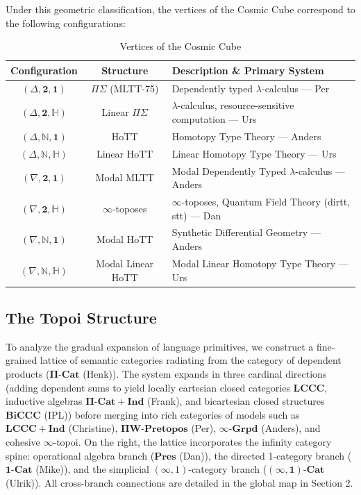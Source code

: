 \documentclass{article}
\theoremstyle{definition}
\theoremstyle{plain}
\begin{document}
Under this geometric classification, the vertices of the Cosmic Cube correspond to the following configurations:
\begin{table}[ht!]
\centering
\caption{Vertices of the Cosmic Cube}
\label{tab:cosmic_cube}
\begin{tabular}{ccl}
\hline
\textbf{Configuration} & \textbf{Structure} & \textbf{Description \& Primary System} \\
\hline
$(\Delta, \mathbf{2}, \mathbf{1})$ & $\Pi\Sigma$ (MLTT-75) & Dependently typed $\lambda$-calculus --- Per \\
$(\Delta, \mathbf{2}, \mathbb{H})$ & Linear $\Pi\Sigma$ & $\lambda$-calculus, resource-sensitive computation --- Urs \\
$(\Delta, \mathbb{N}, \mathbf{1})$ & HoTT & Homotopy Type Theory --- Anders \\
$(\Delta, \mathbb{N}, \mathbb{H})$ & Linear HoTT & Linear Homotopy Type Theory --- Urs \\
$(\nabla, \mathbf{2}, \mathbf{1})$ & Modal MLTT & Modal Dependently Typed $\lambda$-calculus --- Anders \\
$(\nabla, \mathbf{2}, \mathbb{H})$ & $\infty$-toposes & $\infty$-toposes, Quantum Field Theory (dirtt, stt) --- Dan \\
$(\nabla, \mathbb{N}, \mathbf{1})$ & Modal HoTT & Synthetic Differential Geometry --- Anders \\
$(\nabla, \mathbb{N}, \mathbb{H})$ & Modal Linear HoTT & Modal Linear Homotopy Type Theory --- Urs \\
\hline
\end{tabular}
\end{table}

\newpage
\subsection{The Topoi Structure}
To analyze the gradual expansion of language primitives, we construct a fine-grained lattice of semantic categories radiating from the category of dependent products ($\mathbf{\Pi}\text{-}\mathbf{Cat}$ (Henk)). The system expands in three cardinal directions (adding dependent sums to yield locally cartesian closed categories $\mathbf{LCCC}$, inductive algebras $\mathbf{\Pi}\text{-}\mathbf{Cat} + \mathbf{Ind}$ (Frank), and bicartesian closed structures $\mathbf{BiCCC}$ (IPL)) before merging into rich categories of models such as $\mathbf{LCCC} + \mathbf{Ind}$ (Christine), $\mathbf{\Pi W}\text{-}\mathbf{Pretopos}$ (Per), $\infty\text{-}\mathbf{Grpd}$ (Anders), and cohesive $\infty$-topoi. On the right, the lattice incorporates the infinity category spine: operational algebra branch ($\mathbf{Pres}$ (Dan)), the directed 1-category branch ($\mathbf{1\text{-}Cat}$ (Mike)), and the simplicial $(\infty, 1)$-category branch ($\mathbf{(\infty, 1)\text{-}Cat}$ (Ulrik)). All cross-branch connections are detailed in the global map in Section 2.
\end{document}
